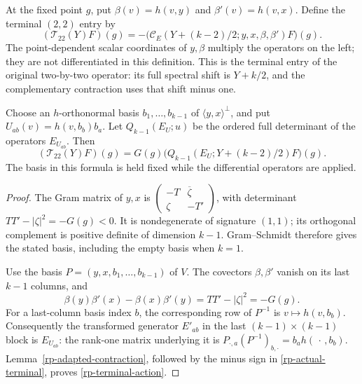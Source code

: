At the fixed point $g$, put
$\beta(v)=h(v,y)$ and $\beta'(v)=h(v,x)$.
Define the terminal $(2,2)$ entry by
\begin{equation}\label{rp-actual-terminal}
 (\mathcal T_{22}(Y)F)(g)
 =-\bigl(\mathcal C_E(Y+(k-2)/2;y,x,\beta,\beta')F\bigr)(g).
\end{equation}
The point-dependent scalar coordinates of $y,\beta$
multiply the operators on the left; they are not
differentiated in this definition.
This is the terminal entry of the original two-by-two
operator: its full spectral shift is $Y+k/2$, and the
complementary contraction uses that shift minus one.

\begin{proposition}\label{rp-terminal-identity}
Choose an $h$-orthonormal basis $b_1,\ldots,b_{k-1}$
of $\langle y,x\rangle^\perp$, and put
$U_{ab}(v)=h(v,b_b)b_a$.  Let
$Q_{k-1}(E_U;u)$ be the ordered full determinant of
the operators $E_{U_{ab}}$.  Then
\begin{equation}\label{rp-terminal-action}
 (\mathcal T_{22}(Y)F)(g)
       =G(g)\bigl(Q_{k-1}(E_U;Y+(k-2)/2)F\bigr)(g).
\end{equation}
The basis in this formula is held fixed while the
differential operators are applied.
\end{proposition}

\begin{proof}
The Gram matrix of $y,x$ is
$\left(\begin{smallmatrix}-T&\overline\zeta\\
\zeta&-T'\end{smallmatrix}\right)$, with determinant
$TT'-|\zeta|^2=-G(g)<0$.  It is nondegenerate of
signature $(1,1)$; its orthogonal complement is positive
definite of dimension $k-1$.  Gram--Schmidt therefore
gives the stated basis, including the empty basis when
$k=1$.

Use the basis $P=(y,x,b_1,\ldots,b_{k-1})$ of $V$.
The covectors $\beta,\beta'$ vanish on its last $k-1$
columns, and
\[
 \beta(y)\beta'(x)-\beta(x)\beta'(y)
                    =TT'-|\zeta|^2=-G(g).
\]
For a last-column basis index $b$, the corresponding
row of $P^{-1}$ is $v\mapsto h(v,b_b)$.
Consequently the transformed generator $E'_{ab}$ in
the last $(k-1)\times(k-1)$ block is $E_{U_{ab}}$:
the rank-one matrix underlying it is
$P_{\cdot,a}(P^{-1})_{b,\cdot}=b_a h(\,\cdot\,,b_b)$.
Lemma~\ref{rp-adapted-contraction}, followed by the
minus sign in \eqref{rp-actual-terminal}, proves
\eqref{rp-terminal-action}.
\end{proof}

